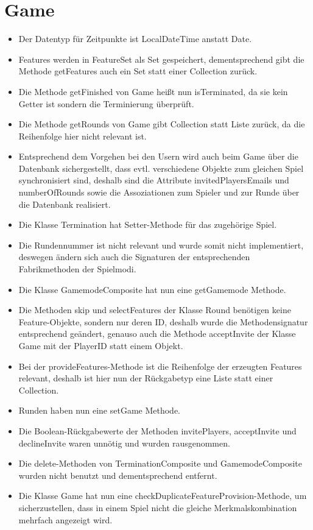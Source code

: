 \documentclass[a4paper]{scrreprt}
\begin{document}
\section{Game}
\begin{itemize}
	\item Der Datentyp für Zeitpunkte ist LocalDateTime anstatt Date.
	\item Features werden in FeatureSet als Set gespeichert, dementsprechend gibt die Methode getFeatures auch ein Set statt einer Collection zurück.
	\item Die Methode getFinished von Game heißt nun isTerminated, da sie kein Getter ist sondern die Terminierung überprüft.
	\item Die Methode getRounds von Game gibt Collection statt Liste zurück, da die Reihenfolge hier nicht relevant ist.
	\item Entsprechend dem Vorgehen bei den Usern wird auch beim Game über die Datenbank sichergestellt, dass evtl. verschiedene Objekte zum gleichen Spiel synchronisiert sind, deshalb sind die Attribute invitedPlayersEmails und numberOfRounds sowie die Assoziationen zum Spieler und zur Runde über die Datenbank realisiert.
	\item Die Klasse Termination hat Setter-Methode für das zugehörige Spiel.
	\item Die Rundennummer ist nicht relevant und wurde somit nicht implementiert, deswegen ändern sich auch die Signaturen der entsprechenden Fabrikmethoden der Spielmodi.
	\item Die Klasse GamemodeComposite hat nun eine getGamemode Methode.
	\item Die Methoden skip und selectFeatures der Klasse Round benötigen keine Feature-Objekte, sondern nur deren ID, deshalb wurde die Methodensignatur entsprechend geändert, genauso auch die Methode acceptInvite der Klasse Game mit der \newline PlayerID statt einem Objekt.
	\item Bei der provideFeatures-Methode ist die Reihenfolge der erzeugten Features relevant, deshalb ist hier nun der Rückgabetyp eine Liste statt einer Collection.
	\item Runden haben nun eine setGame Methode.
	\item Die Boolean-Rückgabewerte der Methoden invitePlayers, acceptInvite und declineInvite waren unnötig und wurden rausgenommen.
	\item Die delete-Methoden von TerminationComposite und GamemodeComposite wurden nicht benutzt und dementsprechend entfernt.
	\item Die Klasse Game hat nun eine checkDuplicateFeatureProvision-Methode, um sicherzustellen, dass in einem Spiel nicht die gleiche Merkmalskombination mehrfach angezeigt wird.
\end{itemize}
\end{document}
